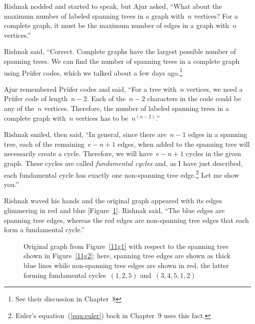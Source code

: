 Rishnak nodded and started to speak, but Ajur asked, ``What about the maximum number of labeled spanning trees in a graph with~$n$ vertices? For a complete graph, it must be the maximum number of edges in a graph with~$n$ vertices.''

Rishnak said, ``Correct. Complete graphs have the largest possible number of spanning trees. We can find the number of spanning trees in a complete graph using Pr{\"u}fer codes, which we talked about a few days ago.\footnote{See their discussion in Chapter~8}

Ajur remembered Pr\"ufer codes and said, ``For a tree with~$n$ vertices, we need a Pr{\"u}fer code of length~$n-2$. Each of the~$n-2$ characters in the code could be any of the~$n$ vertices. Therefore, the number of labeled spanning trees in a complete graph with~$n$ vertices has to be~$n^{(n-2)}$.''

Rishnak smiled, then said, ``In general, since there are~$n-1$ edges in a spanning tree, each of the remaining~$e-n+1$ edges, when added to the spanning tree will necessarily create a cycle. Therefore, we will have~$e-n+1$ cycles in the given graph. These cycles are called \textit{fundamental cycles} and, as I have just described, each fundamental cycle has exactly one non-spanning tree edge.\footnote{Euler's equation~(\ref{eqn:euler}) back in Chapter~9 uses this fact.} Let me show you.''

Rishnak waved his hands and the original graph appeared with its edges glimmering in red and blue [Figure~\ref{11g4}]. Rishnak said, ``The blue edges are spanning tree edges, whereas the red edges are non-spanning tree edges that each form a fundamental cycle.''

\begin{figure}
\begin{center}
\caption{Original graph from Figure~\ref{11g1} with respect to the spanning tree shown in Figure~\ref{11g2}; here, spanning tree edges are shown as thick blue lines while non-spanning tree edges are shown in red, the latter forming fundamental cycles~$(1,2,5)$ and~$(3,4,5,1,2)$}\label{11g4}
\end{center}
\end{figure}

